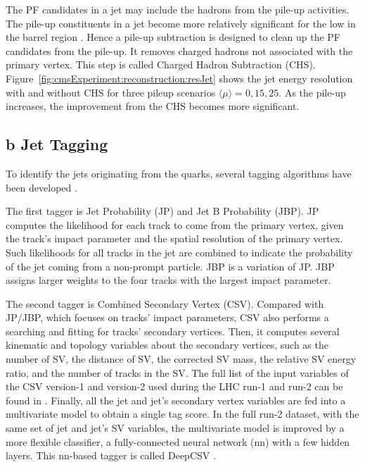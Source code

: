 The PF candidates in a jet may include the hadrons from the pile-up activities. The pile-up constituents in a jet become more relatively significant for the low \pt in the barrel region \cite{cms:particleflow:Sirunyan:2017ulk}. Hence a pile-up subtraction is designed to clean up the PF candidates from the pile-up. It removes charged hadrons not associated with the primary vertex. This step is called Charged Hadron Subtraction (CHS). Figure~\ref{fig:cmsExperiment:reconstruction:resJet} shows the jet energy resolution with and without CHS for three pileup scenarios $\langle \mu\rangle =0,15,25$. As the pile-up increases, the improvement from the CHS becomes more significant.  





\subsection{b Jet Tagging}
\label{sec:cmsExperiment:reconstruction:btag}

To identify the jets originating from the \PQb quarks, several tagging algorithms have been developed \cite{Chatrchyan:2012jua, Sirunyan:2017ezt, Bols:2020bkb}. 

The first tagger is Jet Probability (JP) and Jet B Probability (JBP). JP computes the likelihood for each track to come from the primary vertex, given the track's impact parameter and the spatial resolution of the primary vertex. Such likelihoods for all tracks in the jet are combined to indicate the probability of the jet coming from a non-prompt particle. JBP is a variation of JP. JBP assigns larger weights to the four tracks with the largest impact parameter. 

The second tagger is Combined Secondary Vertex (CSV). Compared with JP/JBP, which focuses on tracks' impact parameters, CSV also performs a searching and fitting for tracks' secondary vertices. Then, it computes several kinematic and topology variables about the secondary vertices, such as the number of SV, the distance of SV, the corrected SV mass, the relative SV energy ratio, and the number of tracks in the SV. The full list of the input variables of the CSV version-1 and version-2 used during the LHC run-1 and run-2 can be found in \cite{Sirunyan:2017ezt}. Finally, all the jet and jet's secondary vertex variables are fed into a multivariate model to obtain a single \PQb tag score. In the full run-2 dataset, with the same set of jet and jet's SV variables, the multivariate model is improved by a more flexible classifier, a fully-connected neural network (nn) with a few hidden layers. This nn-based tagger is called DeepCSV \cite{Bols:2020bkb}.

